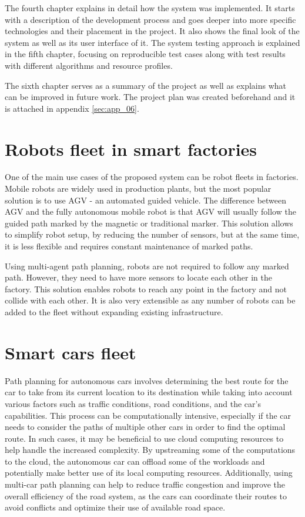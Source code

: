 The fourth chapter explains in detail how the system was implemented. It starts with a description of the development process and goes deeper into more specific technologies and their placement in the project. It also shows the final look of the system as well as its user interface of it. The system testing approach is explained in the fifth chapter, focusing on reproducible test cases along with test results with different algorithms and resource profiles.

The sixth chapter serves as a summary of the project as well as explains what can be improved in future work. The project plan was created beforehand and it is attached in appendix \ref{sec:app_06}. 

\section{Robots fleet in smart factories}
One of the main use cases of the proposed system can be robot fleets in factories. Mobile robots are widely used in production plants, but the most popular solution is to use AGV - an automated guided vehicle\cite{agv}. The difference between AGV and the fully autonomous mobile robot is that AGV will usually follow the guided path marked by the magnetic or traditional marker. This solution allows to simplify robot setup, by reducing the number of sensors, but at the same time, it is less flexible and requires constant maintenance of marked paths.

Using multi-agent path planning, robots are not required to follow any marked path. However, they need to have more sensors to locate each other in the factory. This solution enables robots to reach any point in the factory and not collide with each other. It is also very extensible as any number of robots can be added to the fleet without expanding existing infrastructure.

\section{Smart cars fleet}

Path planning for autonomous cars involves determining the best route for the car to take from its current location to its destination while taking into account various factors such as traffic conditions, road conditions, and the car's capabilities. This process can be computationally intensive, especially if the car needs to consider the paths of multiple other cars in order to find the optimal route. In such cases, it may be beneficial to use cloud computing resources to help handle the increased complexity. By upstreaming some of the computations to the cloud, the autonomous car can offload some of the workloads and potentially make better use of its local computing resources. Additionally, using multi-car path planning can help to reduce traffic congestion and improve the overall efficiency of the road system, as the cars can coordinate their routes to avoid conflicts and optimize their use of available road space.